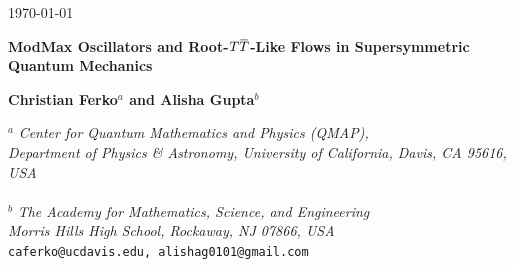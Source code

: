 \documentclass[12pt]{article}
\numberwithin{equation}{section}
\newcommand{\overbar}[1]{\mkern 1.5mu\overline{\mkern-1.5mu#1\mkern-1.5mu}\mkern 1.5mu}
\def\TT{{T\overbar{T}}}
\begin{document}
\begin{titlepage}
\begin{flushright}
\today
\end{flushright}
\vspace{5mm}

\begin{center}
{\Large \bf 
ModMax Oscillators and Root-$\TT$-Like Flows in Supersymmetric Quantum Mechanics
}
\end{center}

\begin{center}

{\bf
Christian Ferko${}^{a}$
and
Alisha Gupta${}^{b}$
} \\
\vspace{5mm}

\footnotesize{
${}^{a}$
{\it 
Center for Quantum Mathematics and Physics (QMAP), 
\\ Department of Physics \& Astronomy,  University of California, Davis, CA 95616, USA
}
 \\~\\
${}^{b}$
{\it 
The Academy for Mathematics, Science, and Engineering \\ Morris Hills High School, Rockaway, NJ 07866, USA
}}
\vspace{2mm}
~\\
\texttt{caferko@ucdavis.edu, alishag0101@gmail.com}\\
\vspace{2mm}


\end{center}

\begin{abstract}
\baselineskip=14pt

\noindent We construct a deformation of any $(0+1)$-dimensional theory of $N$ bosons with $SO(N)$ symmetry which is driven by a function of conserved quantities that resembles the root-$\TT$ operator of $2d$ quantum field theories. In the special case of $N=2$ bosons and a harmonic oscillator potential, the solution to the flow equation is the ModMax oscillator of \href{https://arxiv.org/abs/2209.06296}{2209.06296}.
%
We argue that the deforming operator is related, in a particular special regime, to the dimensional reduction of the $2d$ root-$\TT$ operator on a spatial circle.
%
It follows that the ModMax oscillator is a dimensional reduction of the $4d$ ModMax theory to quantum mechanics, justifying the name.
%
We then show how to construct a manifestly supersymmetric extension of this root-$\TT$-like operator for any $(0+1)$-dimensional theory with $SO(N)$ symmetry and $\mathcal{N}=2$ supersymmetry by defining a flow equation directly in superspace. 

\end{abstract}
\vspace{5mm}

















\vfill
\end{titlepage}
\end{document}
